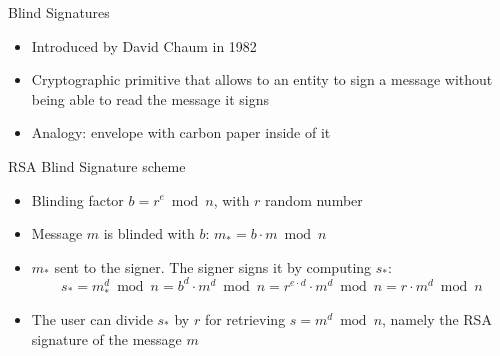 \documentclass{beamer}
\begin{document}
  
  
  \begin{frame}{Blind Signatures}
      \begin{itemize}
          \item Introduced by David Chaum in 1982 \cite{chaum1982blind}
          \item Cryptographic primitive that allows to an entity to sign a message without being able to read the message it signs 
          \item Analogy: envelope with carbon paper inside of it 
      \end{itemize}
      
      \pause
      \begin{block}{RSA Blind Signature scheme}
        \begin{itemize}
            \item Blinding factor $b=r^{e}\bmod n$, with $r$ random number
            \item Message $m$ is blinded with $b$: $m_{*}=b\cdot m\bmod n$
            \item $m_*$ sent to the signer. The signer signs it by
          computing $s_*$: \[ s_*=m_*^d\bmod n = b^d\cdot m^d\bmod n = r^{e\cdot d}\cdot m^d \bmod n = r\cdot m^d \bmod n \]
            \item The user can divide $s_*$ by $r$ for retrieving $s=m^d\bmod n$, namely the RSA signature of the message $m$
        \end{itemize}
      \end{block}
  \end{frame}
  
  
  
\end{document}
